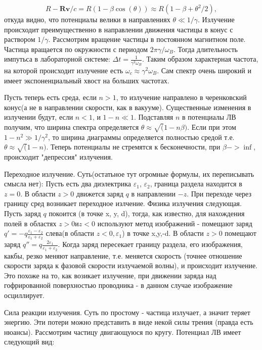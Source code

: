 \documentclass[10pt, a4paper]{article}
\numberwithin{equation}{section}
\begin{document}
\begin{equation}
    R - \mathbf{R}\mathbf{v}/c=R(1-\beta\cos(\theta))\approx R(1-\beta+\theta^2/2),
\end{equation}
откуда видно, что потенциалы велики в направлениях $\theta \ll 1/\gamma$. Излучение происходит преимущественно в
направлении движения частицы в конус с раствором $1/\gamma$. Рассмотрим вращение частицы в постоянном магнитном поле. 
Частица вращается по окружности с периодом $2\pi\gamma/\omega_B$. Тогда длительность импутьса в лабораторной системе:
$\Delta t = \frac{1}{\gamma^2\omega_B}$. Таким образом характерная частота, на которой происходит излучение есть 
$\omega_c \approx \gamma^2\omega_B$. Сам спектр очень широкий и имеет экспоненциальный хвост на больших частотах.

Пусть теперь есть среда, если $n>1$, то излучение направлено в черенковский конус(а не в направлении скорости, как в 
вакууме).
Существенные изменения в излучении будут, если $n<1$, и $1-n\ll1$. Подставляя $n$ в потенциалы ЛВ получим, что
ширина спектра определяется $\theta \approx \sqrt(1-n\beta)$. Если при этом $1-n^2\gg1/\gamma^2$, то ширина диаграммы
определяется полностью средой т.е. $\theta\approx\sqrt(1-n)$. Теперь потенциалы не стремятся к бесконечности, при
$\beta ->\inf$, происходит "депрессия" излучения.

Переходное излучение.
Суть(остатьное тут огромные формулы, их переписывать смысла нет): Пусть есть два диэлектрика $\varepsilon_1$,
$\varepsilon_2$, граница раздела находится в $z=0$. В области $z>0$ движется заряд $q$ в направлении $-z$. При переходе
через границу сред возникает переходное излчение.
Физика излучения следующая. Пусть заряд $q$ покоится (в точке x, y, d), тогда, как известно, для нахождения
полей в областях $z>0 и z<0$ используют метод изображений - помещают заряд
$q'=-q\frac{\varepsilon_1-\varepsilon_2}{\varepsilon_1+\varepsilon_2}$ 
слева(в области $z<0, \varepsilon_1$) в точке x,y,-d. В области $z>0$ помещают 
заряд $q''=q\frac{2\varepsilon_1}{\varepsilon_1+\varepsilon_2}$.
Когда заряд пересекает границу раздела, его изображения, какбы, резко меняют направление, т.е. меняется скорость
(точнее отношение скорости заряда к фазовой скорости излучаемой волны), и происходит излучение. Это похоже на то,
как возикает излучение, при движении заряда над гофрированной поверхностью проводника - в данном случае изображение 
осциллирует.

Сила реакции излучения.
Суть по простому - частица излучает, а значит теряет энергию. Эти потери можно представить в виде некой силы трения
(правда есть нюансы). Рассмотрим частицу двигающуюся по кругу. Потенциал ЛВ имеет следующий вид:
\end{document}
